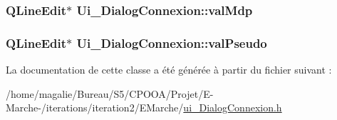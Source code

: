 \hypertarget{class_ui___dialog_connexion_ae59151879eebdd101eaae39a532cdff8}{
\subsubsection[{val\-Mdp}]{\setlength{\rightskip}{0pt plus 5cm}Q\-Line\-Edit$\ast$ Ui\-\_\-\-Dialog\-Connexion\-::val\-Mdp}}\label{class_ui___dialog_connexion_ae59151879eebdd101eaae39a532cdff8}
\hypertarget{class_ui___dialog_connexion_a4560ad500c66e02c38d52f01b71c5c8b}{
\subsubsection[{val\-Pseudo}]{\setlength{\rightskip}{0pt plus 5cm}Q\-Line\-Edit$\ast$ Ui\-\_\-\-Dialog\-Connexion\-::val\-Pseudo}}\label{class_ui___dialog_connexion_a4560ad500c66e02c38d52f01b71c5c8b}


La documentation de cette classe a été générée à partir du fichier suivant \-:\begin{DoxyCompactItemize}
\item 
/home/magalie/\-Bureau/\-S5/\-C\-P\-O\-O\-A/\-Projet/\-E-\/\-Marche-\//iterations/iteration2/\-E\-Marche/\hyperlink{ui___dialog_connexion_8h}{ui\-\_\-\-Dialog\-Connexion.\-h}\end{DoxyCompactItemize}
